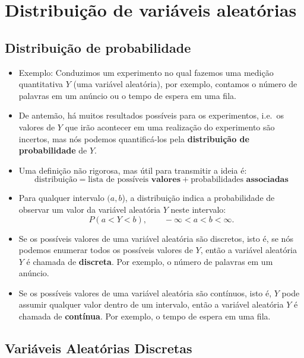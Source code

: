 \documentclass[]{article}
\begin{document}
\section{Distribuição de variáveis
aleatórias}\label{distribuicao-de-variaveis-aleatorias}

\subsection{Distribuição de
probabilidade}\label{distribuicao-de-probabilidade}

\begin{itemize}
\item
  Exemplo: Conduzimos um experimento no qual fazemos uma medição
  quantitativa \(Y\) (uma variável aleatória), por exemplo, contamos o
  número de palavras em um anúncio ou o tempo de espera em uma fila.
\item
  De antemão, há muitos resultados possíveis para os experimentos,
  i.e.~os valores de \(Y\) que irão acontecer em uma realização do
  experimento são incertos, mas nós podemos quantificá-los pela
  \textbf{distribuição de probabilidade} de \(Y\).
\item
  Uma definição não rigorosa, mas útil para transmitir a ideia é:
  \[ \text{distribuição} = \text{lista de possíveis} \textbf{ valores} + \text{probabilidades} \textbf{ associadas} \]
\item
  Para qualquer intervalo \((a, b\)), a distribuição indica a
  probabilidade de observar um valor da variável aleatória \(Y\) neste
  intervalo: \[ P(a<Y<b),\qquad -\infty < a < b < \infty.\]
\item
  Se os possíveis valores de uma variável aleatória são discretos, isto
  é, se nós podemos enumerar todos os possíveis valores de \(Y\), então
  a variável aleatória \(Y\) é chamada de \textbf{discreta}. Por
  exemplo, o número de palavras em um anúncio.
\item
  Se os possíveis valores de uma variável aleatória são contínuos, isto
  é, \(Y\) pode assumir qualquer valor dentro de um intervalo, então a
  variável aleatória \(Y\) é chamada de \textbf{contínua}. Por exemplo,
  o tempo de espera em uma fila.
\end{itemize}

\subsection{Variáveis Aleatórias
Discretas}\label{variaveis-aleatorias-discretas}
\end{document}
